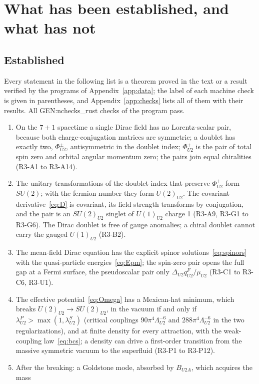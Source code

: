 \section{What has been established, and what has not}
\label{sec:status}

\subsection{Established}

Every statement in the following list is a theorem proved in the text or a result verified by the
programs of Appendix~\ref{app:data}; the label of each machine check is given in parentheses, and
Appendix~\ref{app:checks} lists all of them with their results. All
{{GEN:nchecks_rust}} checks of the program pass.
\begin{enumerate}
\item On the $7+1$ spacetime a single Dirac field has no Lorentz-scalar pair, because both
charge-conjugation matrices are symmetric; a doublet has exactly two, $\Phi^\pm_{U2}$, antisymmetric in
the doublet index; $\Phi^+_{U2}$ is the pair of total spin zero and orbital angular momentum zero; the
pairs join equal chiralities (R3-A1 to R3-A14).
\item The unitary transformations of the doublet index that preserve $\Phi^+_{U2}$ form $SU(2)$; with the
fermion number they form $U(2)_{U2}$. The covariant derivative~\eqref{eq:D} is covariant, its field
strength transforms by conjugation, and the pair is an $SU(2)_{U2}$ singlet of $U(1)_{U2}$ charge 1
(R3-A9, R3-G1 to R3-G6). The Dirac doublet is free of gauge anomalies; a chiral doublet cannot carry the
gauged $U(1)_{U2}$ (R3-B2).
\item The mean-field Dirac equation has the explicit spinor solutions~\eqref{eq:spinors} with the
quasi-particle energies~\eqref{eq:Epm}; the spin-zero pair opens the full gap at a Fermi surface, the
pseudoscalar pair only $\Delta_{U2}q^F_{U2}/\mu_{U2}$ (R3-C1 to R3-C6, R3-U1).
\item The effective potential~\eqref{eq:Omega} has a Mexican-hat minimum, which breaks
$U(2)_{U2}\to SU(2)_{U2}$, in the vacuum if and only if $\lambda^P_{U2}>\max(1,\lambda^S_{U2})$
(critical couplings $90\pi^4\Lambda^{-6}_{U2}$ and $288\pi^4\Lambda^{-6}_{U2}$ in the two
regularizations), and at finite density for every attraction, with the weak-coupling law~\eqref{eq:bcs};
a density can drive a first-order transition from the massive symmetric vacuum to the superfluid
(R3-P1 to R3-P12).
\item After the breaking: a Goldstone mode, absorbed by $B_{U2A}$, which acquires the mass

\end{enumerate}
